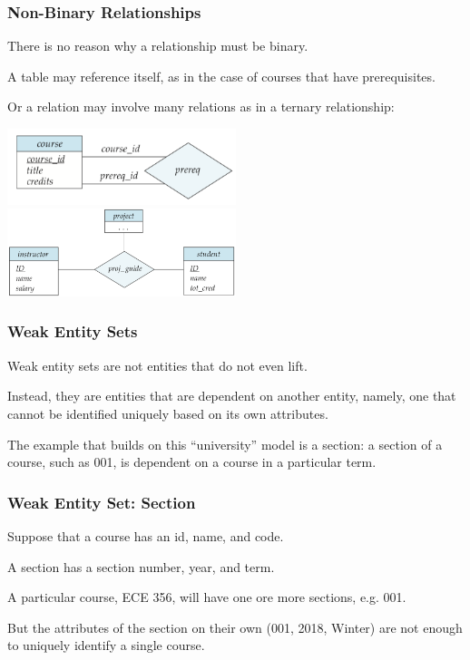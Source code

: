 \begin{frame}
\frametitle{Non-Binary Relationships}

There is no reason why a relationship must be binary.

A table may reference itself, as in the case of courses that have prerequisites.

Or a relation may involve many relations as in a ternary relationship:

\begin{center}
\includegraphics[width=0.5\textwidth]{images/prereq}\\
\includegraphics[width=0.5\textwidth]{images/er-ternary}
\end{center}

\end{frame}



\begin{frame}
\frametitle{Weak Entity Sets}

Weak entity sets are not entities that do not even lift. 

Instead, they are entities that are dependent on another entity, namely, one that cannot be identified uniquely based on its own attributes. 

The example that builds on this ``university'' model is a section: a section of a course, such as 001, is dependent on a course in a particular term. 

\end{frame}


\begin{frame}
\frametitle{Weak Entity Set: Section}

Suppose that a course has an id, name, and code. 

A section has a section number, year, and term. 

A particular course, ECE 356, will have one ore more sections, e.g. 001. 

But the attributes of the section on their own (001, 2018, Winter) are not enough to uniquely identify a single course. 

\end{frame}

